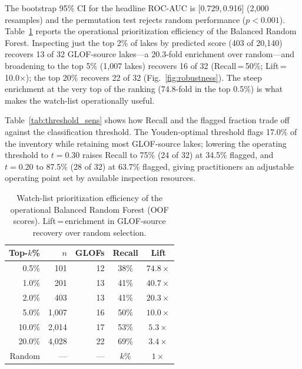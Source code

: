 \documentclass[pdflatex,sn-basic]{sn-jnl}%
\begin{document}
The bootstrap 95\% CI for the headline ROC-AUC is [0.729,\,0.916]
(2{,}000 resamples) and the permutation test rejects random performance
($p<0.001$).
Table~\ref{tab:robustness} reports the operational prioritization
efficiency of the Balanced Random Forest. Inspecting just the top 2\% of
lakes by predicted score (403 of 20{,}140) recovers 13 of 32 GLOF-source
lakes---a 20.3-fold enrichment over random---and broadening to the top 5\%
(1{,}007 lakes) recovers 16 of 32 (Recall\,=\,50\%; Lift\,=\,10.0$\times$);
the top 20\% recovers 22 of 32 (Fig.~\ref{fig:robustness}). The steep
enrichment at the very top of the ranking (74.8-fold in the top 0.5\%) is
what makes the watch-list operationally useful.

Table~\ref{tab:threshold_sens} shows how Recall and the flagged fraction
trade off against the classification threshold. The Youden-optimal
threshold flags 17.0\% of the inventory while retaining most GLOF-source
lakes; lowering the operating threshold to $t\!=\!0.30$ raises Recall to
75\% (24 of 32) at 34.5\% flagged, and $t\!=\!0.20$ to 87.5\% (28 of 32) at
63.7\% flagged, giving practitioners an adjustable operating point set by
available inspection resources.

\begin{table}[!t]
\caption{Watch-list prioritization efficiency of the operational
  Balanced Random Forest (OOF scores). Lift\,=\,enrichment in GLOF-source
  recovery over random selection.}
\label{tab:robustness}
\centering
\begin{tabular}{rrrcc}
\toprule
\textbf{Top-$k$\%} & \textbf{$n$} & \textbf{GLOFs}
  & \textbf{Recall} & \textbf{Lift} \\
\midrule
0.5\%  &   101 & 12 & 38\% & $74.8\times$ \\
1.0\%  &   201 & 13 & 41\% & $40.7\times$ \\
2.0\%  &   403 & 13 & 41\% & $20.3\times$ \\
5.0\%  & 1{,}007 & 16 & 50\% & $10.0\times$ \\
10.0\% & 2{,}014 & 17 & 53\% &  $5.3\times$ \\
20.0\% & 4{,}028 & 22 & 69\% &  $3.4\times$ \\
\midrule
Random & --- & --- & $k$\% & $1\times$ \\
\bottomrule
\end{tabular}
\end{table}
\end{document}
